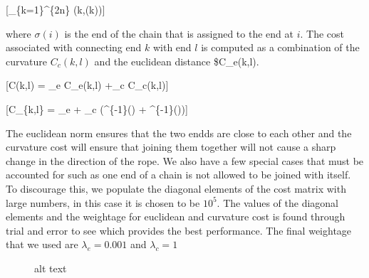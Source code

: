 {[}\min \sum\_\{k=1\}\^{}\{2n\} (k,\sigma(k)){]}

where \(\sigma(i)\) is the end of the chain that is assigned to the end
at \(i\). The cost associated with connecting end \(k\) with end \(l\)
is computed as a combination of the curvature \(C_c(k,l)\) and the
euclidean distance \$C\_e(k,l).

{[}C(k,l) = \lambda\_e C\_e(k,l) +\lambda\_c C\_c(k,l){]}

{[}C\_\{k,l\} = \lambda\_e  + \lambda\_c
\left(\cos\^{}\{-1\}\left(\right)
+
\cos\^{}\{-1\}\left(\right)\right){]}

The euclidean norm ensures that the two endds are close to each other
and the curvature cost will ensure that joining them together will not
cause a sharp change in the direction of the rope. We also have a few
special cases that must be accounted for such as one end of a chain is
not allowed to be joined with itself. To discourage this, we populate
the diagonal elements of the cost matrix with large numbers, in this
case it is chosen to be \(10^5\). The values of the diagonal elements
and the weightage for euclidean and curvature cost is found through
trial and error to see which provides the best performance. The final
weightage that we used are \(\lambda_e = 0.001\) and \(\lambda_c = 1\)

\begin{figure}
\centering
{}
\caption{alt text}
\end{figure}

